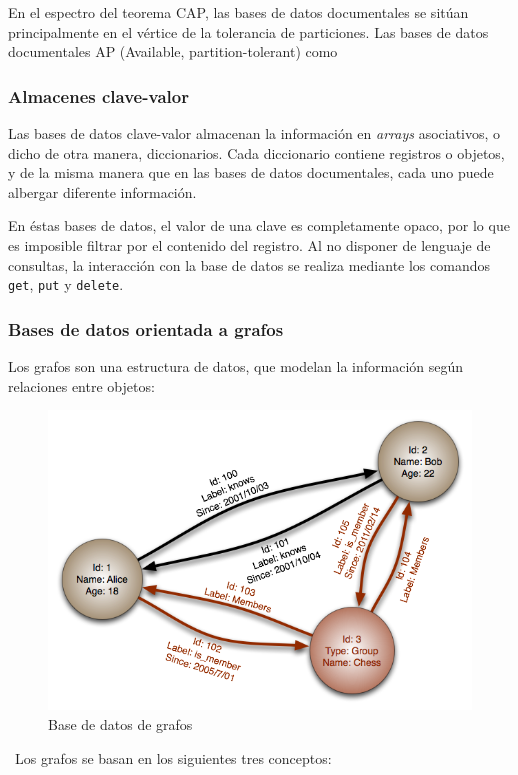En el espectro del teorema CAP, las bases de datos documentales se sitúan principalmente en
el vértice de la tolerancia de particiones. Las bases de datos documentales AP (Available,
partition-tolerant) como 

\subsubsection{Almacenes clave-valor}
\label{subsubsec:state_NoSQL_types_keyval}

Las bases de datos clave-valor almacenan la información en \emph{arrays}
asociativos, o dicho de otra manera, diccionarios. Cada diccionario contiene
registros o objetos, y de la misma manera que en las bases de datos
documentales, cada uno puede albergar diferente información.

En éstas bases de datos, el valor de una clave es completamente opaco, por lo
que es imposible filtrar por el contenido del registro. Al no disponer de
lenguaje de consultas, la interacción con la base de datos se realiza mediante
los comandos \texttt{get}, \texttt{put} y \texttt{delete}.

\subsubsection{Bases de datos orientada a grafos}
\label{subsubsec:state_NoSQL_types_graph}

Los grafos son una estructura de datos, que modelan la información según
relaciones entre objetos:

\begin{figure}[ht!]
  \centering
  \includegraphics[scale=0.75]{img/graphDB.png}
  \caption{\label{fig:grafo} Base de datos de grafos}
\end{figure}
\
Los grafos se basan en los siguientes tres conceptos:

